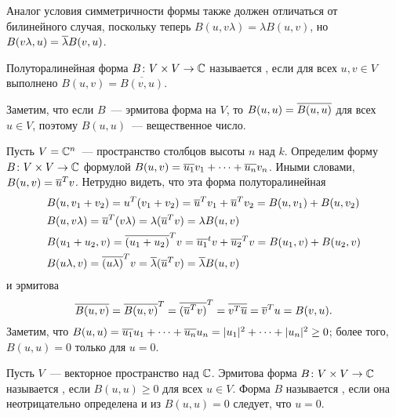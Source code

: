 Аналог условия симметричности формы также должен отличаться от
билинейного случая, поскольку теперь $B(u,v\lambda)=\lambda B(u,v)$,
но $B(v\lambda,u) = \overline\lambda B(v,u)$.

\begin{definition}
Полуторалинейная форма $B\colon V\times V\to\mathbb C$ называется
, если для всех $u,v\in V$
выполнено $B(u,v) = \overline{B(v,u)}$.
\end{definition}

\begin{remark}\label{rem:hermitian_square_is_real}
Заметим, что если $B$~--- эрмитова форма на $V$, то $B(u,u) =
\overline{B(u,u)}$ для всех $u\in V$, поэтому $B(u,u)$~--- вещественное число.
\end{remark}

\begin{example}\label{example:standard_sesquilinear_form}
Пусть  $V=\mathbb C^n$~--- пространство столбцов
высоты $n$ над $k$. Определим форму $B\colon V\times V\to\mathbb C$
формулой $B(u,v) = \overline{u_1}v_1 + \dots + \overline{u_n}v_n$. Иными словами,
$B(u,v) = \overline{u}^Tv$. 
Нетрудно видеть, что эта форма полуторалинейная
\begin{align*}
&B(u,v_1+v_2) = u^T(v_1+v_2) = \overline{u}^Tv_1 + \overline{u}^Tv_2 = B(u,v_1) +
B(u,v_2)\\
&B(u,v\lambda)=\overline{u}^T(v\lambda)=\lambda(\overline{u}^Tv)=\lambda B(u,v)\\
&B(u_1+u_2,v) = \overline{(u_1+u_2)}^Tv = \overline{u_1}^tv + \overline{u_2}^Tv = B(u_1,v)
+ B(u_2,v)\\
&B(u\lambda,v)=\overline{(u\lambda)}^Tv=\overline\lambda(\overline{u}^Tv)=\overline\lambda B(u,v)\\
\end{align*}
и эрмитова
$$
\overline{B(u,v)} = \overline{B(u,v)}^T = \overline{(\overline{u}^Tv)}^T = \overline{v^T\overline{u}} =
\overline{v}^Tu = B(v,u).
$$
Заметим, что $B(u,u) = \overline{u_1}u_1 + \dots + \overline{u_n}u_n
= |u_1|^2 + \dots + |u_n|^2 \geq 0$; более того, $B(u,u) = 0$ только
для $u=0$.
\end{example}

\begin{definition}
Пусть $V$~--- векторное пространство над $\mathbb C$. Эрмитова
форма $B\colon V\times V\to\mathbb C$ называется , если
$B(u,u)\geq 0$ для всех $u\in V$. Форма $B$
называется , если она
неотрицательно определена и из $B(u,u)=0$ следует, что $u=0$.
\end{definition}

